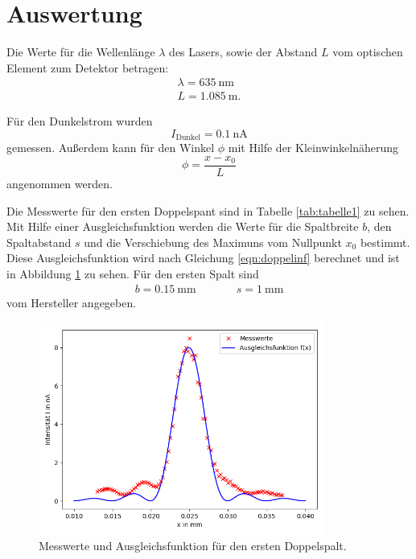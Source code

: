 \section{Auswertung}
\label{sec:Auswertung}
Die Werte für die Wellenlänge $\lambda$ des Lasers, sowie der Abstand $L$ vom optischen Element zum
Detektor betragen:
\begin{align*}
  \lambda=\SI{635}{\nm}\\
  L=\SI{1,085}{\m}.
\end{align*}

Für den Dunkelstrom wurden
\begin{equation*}
   I_{\text{Dunkel}}=\SI{0.1}{\nA}
\end{equation*}
gemessen. Außerdem kann für den Winkel $\phi$ mit Hilfe der Kleinwinkelnäherung
\begin{equation}
  \phi= \frac{x-x_{0}}{L}
\end{equation}
angenommen werden.

Die Messwerte für den ersten Doppelspant sind in Tabelle \ref{tab:tabelle1} zu sehen.
Mit Hilfe einer Ausgleichsfunktion werden die Werte für die Spaltbreite $b$, den
Spaltabstand $s$ und die Verschiebung des Maximuns vom Nullpunkt $x_{0}$ bestimmt.
Diese Ausgleichsfunktion wird nach Gleichung \ref{eqn:doppelinf} berechnet und ist in
Abbildung \ref{fig:plot1} zu sehen.
Für den ersten Spalt sind
\begin{align*}
  b=\SI{0,15}{\mm} &\;\;\;\;\;\;\;\;\;\; s=\SI{1}{\mm}
\end{align*}
vom Hersteller angegeben.


\begin{figure}
  \centering
  \includegraphics[height=7cm]{Figure_1.png}
  \caption{Messwerte und Ausgleichsfunktion für den ersten Doppelspalt.}
  \label{fig:plot1}
\end{figure}

